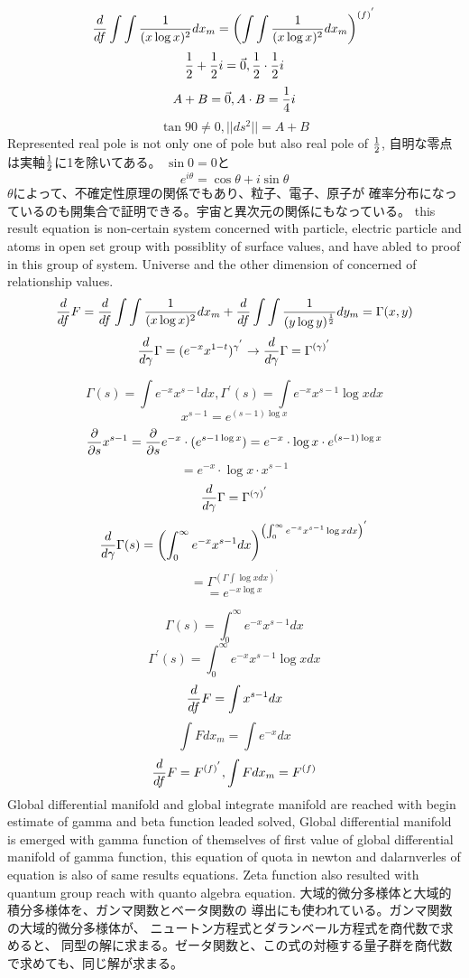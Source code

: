 \documentclass{jsarticle}
\begin{document}
  $$ {d \over df}\int \int{1 \over (x \log x)^2}dx_m = 
  \left(\int \int {1 \over (x \log x)^2}dx_m \right)^{(f)^{'}}$$
  $$ {1 \over 2} + {1 \over 2}i = \vec{0}, {1 \over 2}\cdot{1 \over 2}i $$
  $$ A + B  =  \vec{0}, A \cdot B = {1 \over 4}i $$
  $$  \tan 90 \neq 0, ||ds^2|| = A + B $$
  Represented real pole is not only one of pole but also real pole of 
  $ {1 \over 2} $, 
  自明な零点は実軸${1 \over 2}  $に1を除いてある。
  $\sin 0 = 0$と$$ e^{i \theta} = \cos \theta + i \sin \theta $$
  $\theta $によって、不確定性原理の関係でもあり、粒子、電子、原子が
  確率分布になっているのも開集合で証明できる。宇宙と異次元の関係にもなっている。
  this result equation is non-certain system concerned with particle, electric 
  particle and atoms in open set group with possiblity of surface values,
  and have abled to proof in this group of system. Universe and the other
  dimension of concerned of relationship values.
  $$ {d \over df}F = {d \over df} \int \int{1 \over (x \log x)^2}dx_m 
  + {d \over df} \int \int {1 \over (y \log y)^{1 \over 2}}dy_m
  = \Gamma(x,y) $$
  $$ {d \over d \gamma}\Gamma = (e^{-x}x^{1-t})^{\gamma^{'}} \to
  {d \over d \gamma}\Gamma = \Gamma^{(\gamma)^{'}}$$



    $$ \Gamma(s) = \int e^{-x} x^{s - 1}dx, \Gamma^{'}(s)
    = \int e^{-x} x^{s - 1}\log x dx $$
    $$ x^{s - 1} = e^{(s - 1)\log x} $$
    $$ {\partial \over \partial s}x^{s - 1} =
       {\partial \over \partial s}e^{-x}\cdot (e^{{s - 1}\log x}) 
       = e^{-x}\cdot \log x \cdot e^{(s - 1) \log x} $$
    $$ = e^{-x}\cdot \log x \cdot x^{s - 1} $$
    $$ {d \over d \gamma}\Gamma = \Gamma^{(\gamma)^{'}} $$
    $$ {d \over d \gamma}\Gamma(s) = \left( \int^{\infty}_{0}e^{-x}
    x^{s - 1}dx \right)^{\left(\int^{\infty}_{0}e^{-x}x^{s - 1}\log x dx
    \right)^{'}} $$
    $$ = \Gamma^{(\Gamma \int \log x dx)^{'}} $$
    $$ = e^{-x \log x} $$

    $$ \Gamma(s) = \int^{\infty}_{0} e^{-x}x^{s - 1}dx $$
    $$  \Gamma^{'}(s) = \int^{\infty}_{0} e^{-x}x^{s - 1} \log x dx $$
    $$ {d \over df}F = \int x^{s - 1}dx $$
    $$ \int F dx_m = \int e^{-x}dx $$
    $$ {d \over df}F = F^{(f)^{'}}, \int F dx_m = F^{(f)} $$
    Global differential manifold and global integrate manifold are
    reached with begin estimate of gamma and beta function leaded solved,
    Global differential manifold is emerged with gamma function of
    themselves of first value of global differential manifold of gamma
    function, this equation of quota in newton and dalarnverles of equation
    is also of same results equations. Zeta function also resulted with
    quantum group reach with quanto algebra equation.
    大域的微分多様体と大域的積分多様体を、ガンマ関数とベータ関数の
    導出にも使われている。ガンマ関数の大域的微分多様体が、
    ニュートン方程式とダランベール方程式を商代数で求めると、
    同型の解に求まる。ゼータ関数と、この式の対極する量子群を商代数
    で求めても、同じ解が求まる。
\end{document}
